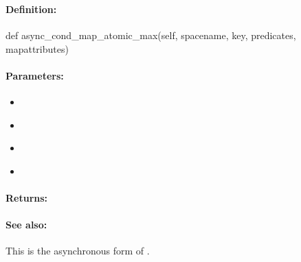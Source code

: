 \pagebreak
\subsubsection{}
\label{api:python:async_cond_map_atomic_max}


\paragraph{Definition:}
\begin{pythoncode}
def async_cond_map_atomic_max(self, spacename, key, predicates, mapattributes)
\end{pythoncode}

\paragraph{Parameters:}
\begin{itemize}[noitemsep]
\item {}\\

\item {}\\

\item {}\\

\item {}\\

\end{itemize}

\paragraph{Returns:}


\paragraph{See also:}  This is the asynchronous form of .

\pagebreak
\subsubsection{}
\label{api:python:search}


